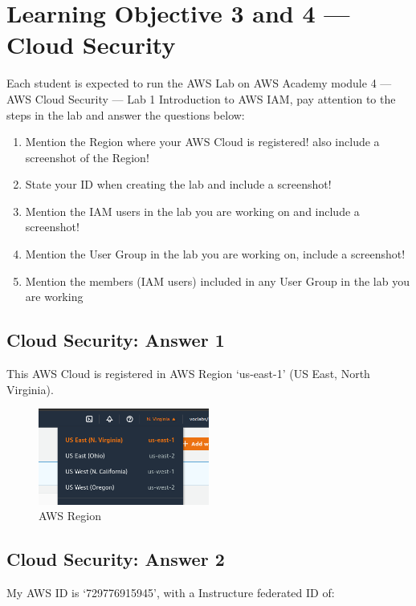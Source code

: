 \documentclass[
  11pt, %
]{assignment}
\begin{document}
\pagebreak

\section*{Learning Objective 3 and 4 --- Cloud Security}

\begin{problem}
Each student is expected to run the AWS Lab on AWS Academy module 4 --- AWS Cloud Security --- Lab 1 Introduction to AWS IAM, pay attention to the steps in the lab and answer the questions below:

\medskip

\begin{enumerate}
	\item Mention the Region where your AWS Cloud is registered! also include a screenshot of the Region!
	\item State your ID when creating the lab and include a screenshot!
	\item Mention the IAM users in the lab you are working on and include a screenshot!
	\item Mention the User Group in the lab you are working on, include a screenshot!
	\item Mention the members (IAM users) included in any User Group in the lab you are working
\end{enumerate}
\end{problem}

\subsection*{Cloud Security: Answer 1} This AWS Cloud is registered in AWS Region `us-east-1' (US East, North Virginia).

\begin{figure}[H]
	\centering
	\includegraphics[width=0.5\textwidth]{graphics/section3/Zone.png}
	\caption{AWS Region}\label{fig:region}
\end{figure}

\subsection*{Cloud Security: Answer 2} My AWS ID is `729776915945', with a Instructure federated ID of:
\end{document}

